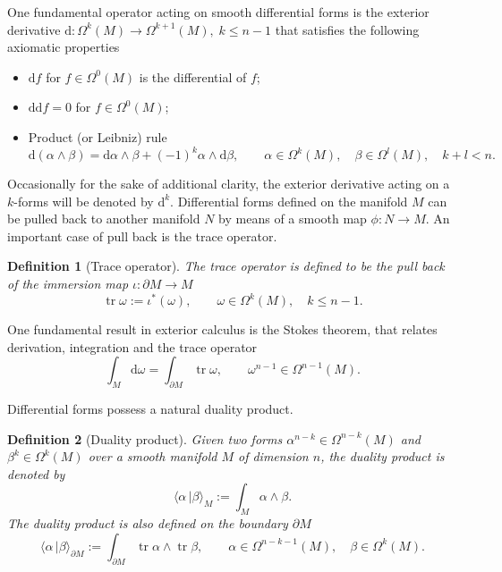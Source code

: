 \documentclass{elsarticle}
\newtheorem{definition}{Definition}
\renewcommand\d{\ensuremath{\mathrm{d}}}
\DeclareMathOperator{\tr}{tr}
\newcommand{\dualpr}[3][]{\ensuremath{\langle #2 \, \vert #3 \rangle_{#1}}}
\begin{document}
One fundamental operator acting on smooth differential forms is the exterior derivative $\d:\Omega^k(M) \rightarrow \Omega^{k+1}(M), \; k\le n-1$ that satisfies the following axiomatic properties
\begin{itemize}
    \item $\d f$ for $f \in \Omega^0(M)$ is the differential of $f$;
    \item $\d\d f = 0$ for $f \in \Omega^0(M)$;
    \item Product (or Leibniz) rule
    \begin{equation}\label{eq:leibniz}
        \d (\alpha \wedge \beta) = \d\alpha \wedge \beta + (-1)^k \alpha \wedge \d\beta, \qquad \alpha \in \Omega^k(M), \quad \beta \in \Omega^l(M), \quad k+l < n.
    \end{equation}
\end{itemize}
Occasionally for the sake of additional clarity, the exterior derivative acting on a $k$-forms will be denoted by $\d^k$. Differential forms defined on the manifold $M$ can be pulled back to another manifold $N$ by means of a
smooth map $\phi: N \rightarrow M$. An important case of pull back is the trace operator.
\begin{definition}[Trace operator]
The trace operator is defined to be the pull back of the immersion map $\iota: \partial M \rightarrow M$
\begin{equation}\label{eq:trace}
    \tr \omega := \iota^*(\omega), \qquad \omega \in \Omega^k(M), \quad k\le n-1.  
\end{equation}
\end{definition}
One fundamental result in exterior calculus is the Stokes theorem, that relates derivation, integration and the trace operator
\begin{equation}\label{eq:Stokes}
    \int_M \d \omega = \int_{\partial M} \tr \omega, \qquad \omega^{n-1} \in \Omega^{n-1}(M).
\end{equation}

Differential forms possess a natural duality product.
\begin{definition}[Duality product]
Given two forms $\alpha^{n-k} \in \Omega^{n-k}(M)$ and $\beta^{k} \in \Omega^{k}(M)$ over a smooth manifold $M$ of dimension $n$, the duality product is denoted by
\begin{equation}\label{eq:dual_pr}
    \dualpr[M]{\alpha}{\beta} := \int_M \alpha \wedge \beta.
\end{equation}
The duality product is also defined on the boundary $\partial M$
\begin{equation}
    \dualpr[\partial M]{\alpha}{\beta} := \int_{\partial M} \tr \alpha \wedge \tr \beta, \qquad \alpha \in \Omega^{n-k-1}(M), \quad  \beta \in \Omega^k(M).
\end{equation}
\end{definition}
\end{document}
